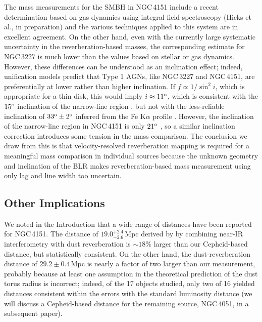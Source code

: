 \documentclass[twocolumn]{aastex63}
\begin{document}
The mass measurements for the SMBH in NGC\,4151 include a recent determination based on gas dynamics using integral field spectroscopy (Hicks et al., in preparation) and the various techniques applied to this system are in excellent agreement. On the other hand, even with the currently large systematic uncertainty in the reverberation-based masses, the corresponding estimate for NGC\,3227 is much lower than the values based on stellar or gas dynamics. However, these differences can be understood as an inclination effect; indeed, unification models \citep{Antonucci93} predict that Type 1 AGNs, like NGC\,3227 and NGC\,4151, are preferentially at lower rather than higher inclination. If $f \propto 1/\sin^2 i$, which is appropriate for a thin disk, this would imply $i \approx 11^{\rm o}$, which is consistent with the $15^{\rm o}$ inclination of the narrow-line region \citep[][though note in their paper the inclination given is the complement of the standard definition]{Fischer2013}, but not with the less-reliable inclination of $33^{\rm o} \pm 2^{\rm o}$ inferred from the Fe K$\alpha$ profile \citep{Patrick2012}. However, the inclination of the narrow-line region in NGC\,4151 is only $21^{\rm o}$ \citep{Winge1999}, so a similar inclination correction introduces some tension in the mass comparison. The conclusion we draw from this is that velocity-resolved reverberation mapping is required for a meaningful mass comparison in individual sources because the unknown geometry and inclination of the BLR makes reverberation-based mass measurement using only lag and line width too uncertain.

\subsection{Other Implications}

We noted in the Introduction that a wide range of distances have been reported for NGC\,4151. The distance of $19.0^{+2.4}_{-2.6}$\,Mpc derived by \cite{Hoenig2014} by combining near-IR interferometry with dust reverberation is $\sim18$\% larger than our Cepheid-based distance, but statistically consistent. On the other hand, the dust-reverberation distance of $29.2 \pm 0.4$\,Mpc \citep{Yoshii2014} is nearly a factor of two larger than our measurement, probably because at least one assumption in the theoretical prediction of the dust torus radius is incorrect; indeed, of the 17 objects studied, only two of 16 yielded distances consistent within the errors with the standard luminosity distance (we will discuss a Cepheid-based distance for the remaining source, NGC\,4051, in a subsequent paper).
\end{document}
